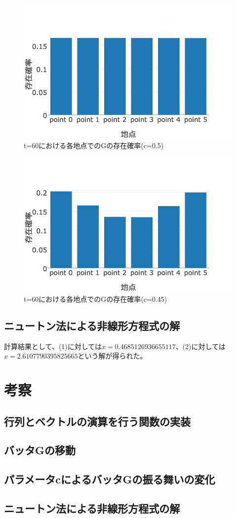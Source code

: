 \documentclass[11pt]{ltjsarticle}
\begin{document}
\begin{figure}
  \includegraphics[width=\textwidth]{fig5.png}
  \caption{ t=60における各地点でのGの存在確率(c=0.5)}
\end{figure}

\begin{figure}
  \includegraphics[width=\textwidth]{fig6.png}
  \caption{ t=60における各地点でのGの存在確率(c=0.45)}
\end{figure}

\subsection{ニュートン法による非線形方程式の解}

計算結果として、(1)に対しては$x = 0.4685126936655117$、(2)に対しては$x = 2.6107790395825665$という解が得られた。


\section{考察}

\subsection{行列とベクトルの演算を行う関数の実装}
\subsection{バッタGの移動}
\subsection{パラメータcによるバッタGの振る舞いの変化}
\subsection{ニュートン法による非線形方程式の解}
\end{document}
